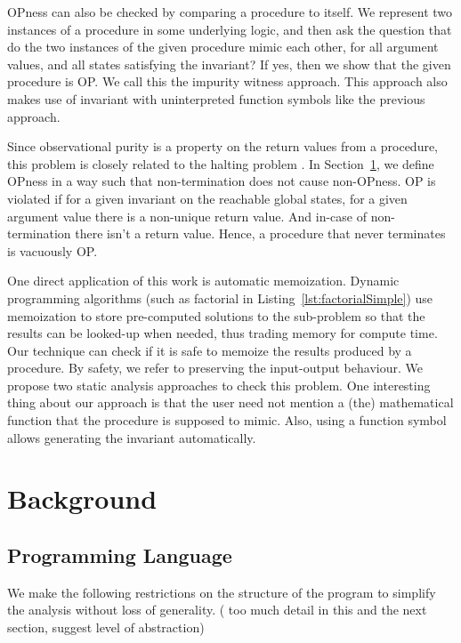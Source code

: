 \documentclass{llncs}
\begin{document}
OPness can also be checked by comparing a procedure to itself. We
represent two instances of a procedure in some underlying logic, and
then ask the question that do the two instances of the given procedure
mimic each other, for all argument values, and all states satisfying
the invariant? If yes, then we show that the given procedure is OP. We
call this the impurity witness approach.  This approach also makes
use of invariant with uninterpreted function symbols like the previous
approach.

Since observational purity is a property on the return values from a
procedure, this problem is closely related to the halting problem
. In
Section~\ref{sec:background}, we define OPness in a way such that
non-termination does not cause non-OPness. OP is violated if for a
given invariant on the reachable global states, for a given argument
value there is a non-unique return value. And in-case of
non-termination there isn't a return value. Hence, a procedure that
never terminates is vacuously OP.

One direct application of this work is automatic memoization. Dynamic
programming algorithms (such as factorial in
Listing~\ref{lst:factorialSimple}) use memoization to store
pre-computed solutions to the sub-problem so that the results can be
looked-up when needed, thus trading memory for compute time. Our
technique can check if it is safe to memoize the results produced by a
procedure. By safety, we refer to preserving the input-output
behaviour. We propose two static analysis approaches to check this
problem. One interesting thing about our approach is that the user
need not mention a (the) mathematical function that the procedure is
supposed to mimic. Also, using a function symbol allows generating the
invariant automatically.

\section{Background} \label{sec:background}

\subsection{Programming Language}
We make the following restrictions on the structure of the program to
simplify the analysis without loss of generality. ( too much detail in
this and the next section, suggest level of abstraction)
\end{document}
